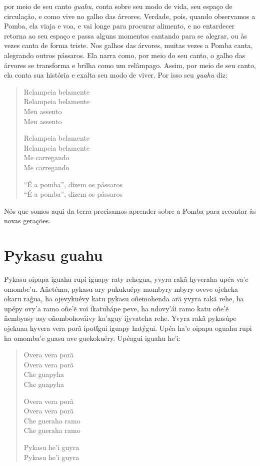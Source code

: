  por meio de seu canto \emph{guahu}, conta sobre seu modo de vida,
seu espaço de circulação, e como vive no galho das árvores. Verdade,
pois, quando observamos a Pomba, ela viaja e voa, e vai longe para
procurar alimento, e no entardecer retorna ao seu espaço e passa alguns
momentos cantando para se alegrar, ou às vezes canta de forma triste.
Nos galhos das árvores, muitas vezes a Pomba canta, alegrando outros
pássaros. Ela narra como, por meio do seu canto, o galho das árvores se
transforma e brilha como um relâmpago. Assim, por meio de seu canto, ela
conta sua história e exalta seu modo de viver. Por isso seu \emph{guahu}
diz:

\begin{verse}
Relampeia belamente\\
Relampeia belamente\\
Meu assento\\
Meu assento

Relampeia belamente\\
Relampeia belamente\\
Me carregando\\
Me carregando

``É a pomba'', dizem os pássaros\\
``É a pomba'', dizem os pássaros
\end{verse}

Nós que somos aqui da terra precisamos aprender sobre a Pomba para
recontar às novas gerações.

\chapter{Pykasu guahu}

Pykasu oipapa iguahu rupi iguapy raty rehegua, yvyra rakã hyveraha upéa
va'e omombe'u. Añetéma, pykasu ary pukukuépy mombyry mbyry oveve ojeheka
okaru rag̃ua, ha ojevykuévy katu pykasu oñemohenda arã yvyra rakã rehe,
ha upépy ovy'a ramo oñe'ẽ voi ikatuhápe peve, ha ndovy'ái ramo katu
oñe'ẽ ñembyasy asy oñombohováivy ka'aguy ijyvateha rehe. Yvyra rakã
pykasúpe ojekuaa hyvera vera porã ipotῖgui iguapy hatýgui. Upéa ha'e
oipapa oguahu rupi ha omomba'e guasu ave guekokuéry. Upéagui iguahu
he'i:

\begin{verse}
Overa vera porã\\
Overa vera porã\\
Che guapyha\\
Che guapyha

Overa vera porã\\
Overa vera porã\\
Che gueraha ramo\\
Che gueraha ramo

Pykasu he'i guyra\\
Pykasu he'i guyra
\end{verse}



